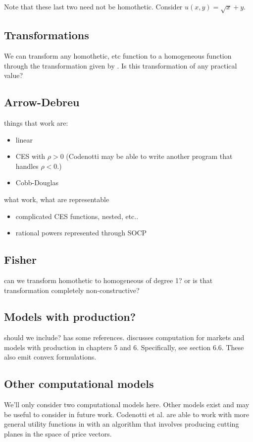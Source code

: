 \documentclass{article}
\begin{document}
Note that these last two need not be homothetic. Consider $u(x,y) = \sqrt{x} + y$.

\subsection{Transformations}
We can transform any homothetic, etc function to a homogeneous function
through the transformation given by \cite{jain2005market}.
Is this transformation of any practical value?


\subsection{Arrow-Debreu}
things that work are:
\begin{itemize}
\item linear
\item CES with $\rho > 0$ (Codenotti may be able to write another program that handles $\rho < 0$.)
\item Cobb-Douglas
\end{itemize}
what work, what are representable
\begin{itemize}
\item complicated CES functions, nested, etc..
\item rational powers represented through SOCP
\end{itemize}
\subsection{Fisher}
can we transform homothetic to homogeneous of degree 1? or is that transformation completely non-constructive?

\subsection{Models with production?}
should we include? \cite{jain2005market} has some references.
\cite{nisan2007algorithmic} discusses computation for markets and models with production in chapters 5 and 6. Specifically, see section 6.6. These also emit convex formulations.

\subsection{Other computational models}
We'll only consider two computational models here. Other models exist and may be useful to consider in future work. Codenotti et al. \cite{codenotti2005polynomial} are able to work with more general utility functions in with an algorithm that involves producing cutting planes in the space of price vectors. 
\end{document}
